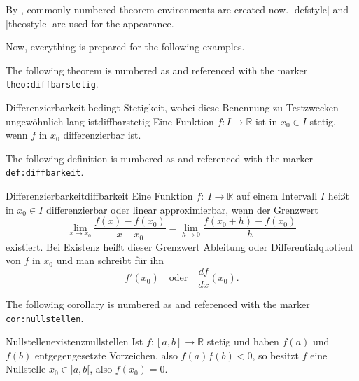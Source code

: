 
By , commonly numbered theorem environments are
created now. |defstyle| and |theostyle| are used for the appearance.

Now, everything is prepared for the following examples.

\begin{dispExample}
The following theorem is numbered as  and
referenced with the marker \texttt{theo:diffbarstetig}.\bigskip

\begin{Theorem}{Differenzierbarkeit bedingt Stetigkeit, wobei diese Benennung
  zu Testzwecken ungew\"{o}hnlich lang ist}{diffbarstetig}%
  Eine Funktion $f:I\to\mathbb{R}$ ist in $x_0\in I$ stetig, wenn $f$ in
  $x_0$ differenzierbar ist.
\end{Theorem}
\end{dispExample}


\begin{dispExample}
The following definition is numbered as  and
referenced with the marker \texttt{def:diffbarkeit}.\bigskip

\begin{Definition}{Differenzierbarkeit}{diffbarkeit}
  Eine Funktion $f:~I\to\mathbb{R}$ auf einem Intervall $I$ hei\ss{}t in
  $x_0\in I$ differenzierbar oder linear approximierbar,
  wenn der Grenzwert
  \begin{equation*}
  \lim\limits_{x\to x_0}\frac{f(x)-f(x_0)}{x-x_0}=
  \lim\limits_{h\to 0}\frac{f(x_0+h)-f(x_0)}{h}
  \end{equation*}
  existiert. Bei Existenz hei\ss{}t dieser Grenzwert Ableitung
  oder Differentialquotient von $f$ in $x_0$ und man
  schreibt f\"{u}r ihn
  \begin{equation*}
  f'(x_0)\quad\text{oder}\quad\frac{df}{dx}(x_0).
  \end{equation*}
\end{Definition}
\end{dispExample}


\begin{dispExample}
The following corollary is numbered as  and
referenced with the marker \texttt{cor:nullstellen}.\bigskip

\begin{Corollary}{Nullstellenexistenz}{nullstellen}
  Ist $f:[a,b]\to\mathbb{R}$ stetig und haben $f(a)$ und $f(b)$ entgegengesetzte
  Vorzeichen, also $f(a)f(b)<0$, so besitzt $f$ eine Nullstelle $x_0\in]a,b[$,
  also $f(x_0)=0$.
\end{Corollary}
\end{dispExample}


